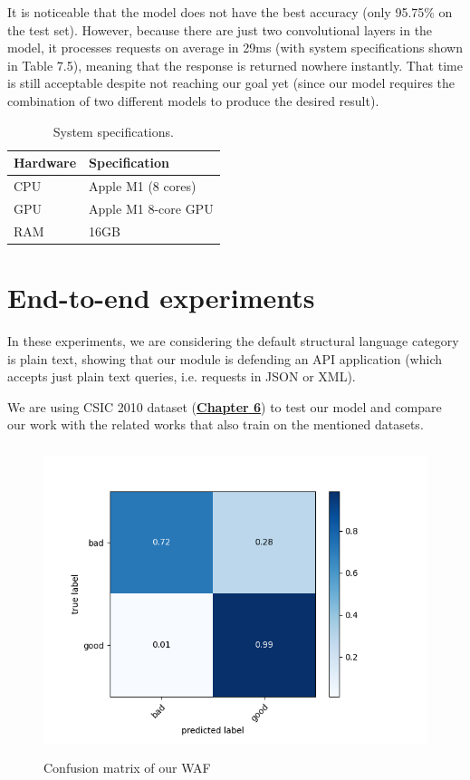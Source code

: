 It is noticeable that the model does not have the best accuracy (only 95.75\% on the test set). However, because there are just two convolutional layers in the model, it processes requests on average in 29ms (with system specifications shown in Table 7.5), meaning that the response is returned nowhere instantly. That time is still acceptable despite not reaching our goal yet (since our model requires the combination of two different models to produce the desired result).

\begin{table}[ht]
\centering
	\begin{tabular}{ll}
	\hline
	\textbf{Hardware} & \textbf{Specification} \\ \hline
	CPU               & Apple M1 (8 cores)     \\
	GPU               & Apple M1 8-core GPU    \\
	RAM               & 16GB                   \\ \hline
	\end{tabular}
	\caption{\label{demo-table-6} System specifications.}
\end{table}
  
\section{End-to-end experiments}
\hspace{0.5cm}In these experiments, we are considering the default structural language category is plain text, showing that our module is defending an API application (which accepts just plain text queries, i.e. requests in JSON or XML).

We are using CSIC 2010 dataset (\hyperref[subsec:csic_2010]{\textbf{Chapter 6}}) to test our model and compare our work with the related works that also train on the mentioned datasets.

\begin{figure}[ht]
	\centering
	\includegraphics[width=\linewidth, height=9cm,keepaspectratio]{figures/confusion 3.png}
	\caption{Confusion matrix of our WAF}
\end{figure}

